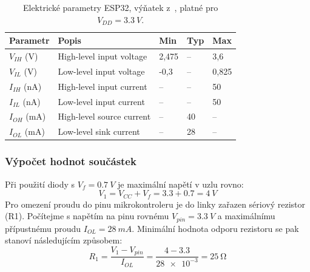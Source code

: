         \begin{table}[h]
            \centering
            \caption{Elektrické parametry ESP32, výňatek z~\cite{esp32-wroom-32e-datasheet}, platné pro \(V_{DD} =\qty{3,3}{V}\).}
            \label{tab:esp32-elektricke-parametry}
            \begin{tabular}{|l|l|l|l|l|}
            \hline
            \textbf{Parametr} & \textbf{Popis} & \textbf{Min} & \textbf{Typ} & \textbf{Max} \\ \hline\hline
            \(V_{IH}\) (V)   & High-level input voltage   & 2,475  & --  & 3,6          \\ \hline
            \(V_{IL}\) (V)   & Low-level input voltage    & -0,3 & --   & 0,825   \\ \hline
            \(I_{IH}\) (nA)  & High-level input current   & --   & --   & 50           \\ \hline
            \(I_{IL}\) (nA)  & Low-level input current    & --   & --   & 50           \\ \hline
            \(I_{OH}\) (mA)  & High-level source current  & --   & 40   & --           \\ \hline
            \(I_{OL}\) (mA)  & Low-level sink current     & --   & 28   & --           \\ \hline
            \end{tabular}
        \end{table}

        \subsubsection{Výpočet hodnot součástek}
            Při použití diody s \(V_{f} =\qty{0.7}{V}\) je maximální napětí v uzlu  rovno:
            \begin{equation}
                V_{1} =V_{CC} +V_{f} = \num{3,3}+\num{0,7}=\qty{4}{V}
            \end{equation}
            Pro omezení proudu do pinu mikrokontroleru je do linky zařazen sériový rezistor (R1). Počítejme s napětím na pinu rovnému \(V_{pin} =\qty{3.3}{V}\) a maximálnímu přípustnému proudu \(I_{OL} =\qty{28}{mA}\). Minimální hodnota odporu rezistoru se pak stanoví následujícím způsobem:
            \begin{equation}
                R_{1} =\frac{V_{1}- V_{pin}}{I_{OL} }=\frac{\num{4}-\num{3.3}}{\num{28e-3}}=\qty{25}{\ohm}
            \end{equation}


